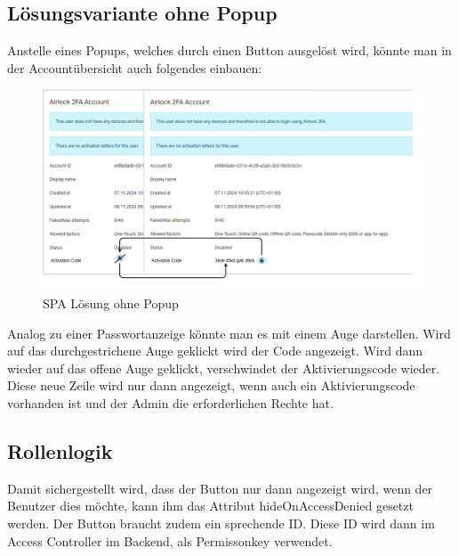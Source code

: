 \subsection{Lösungsvariante ohne Popup}
Anstelle eines Popups, welches durch einen Button ausgelöst wird, könnte man in der Accountübersicht auch folgendes einbauen:
\begin{figure}[H]
	\begin{center}
		\includegraphics[width=1.0\textwidth]{ressourcen/variant_2_spa}
		\caption[Variante ohne Popup]{SPA Lösung ohne Popup}\label{fig:withoutpopup}
	\end{center}
\end{figure}
\noindent Analog zu einer Passwortanzeige könnte man es mit einem Auge darstellen. Wird auf das durchgestrichene Auge geklickt wird der Code angezeigt. Wird dann wieder auf das offene Auge geklickt, verschwindet der Aktivierungscode wieder.\newline
Diese neue Zeile wird nur dann angezeigt, wenn auch ein Aktivierungscode vorhanden ist und der Admin die erforderlichen Rechte hat.

\subsection{Rollenlogik}
Damit sichergestellt wird, dass der Button nur dann angezeigt wird, wenn der Benutzer dies möchte, kann ihm das Attribut \flqq hideOnAccessDenied\frqq{} gesetzt werden. Der Button braucht zudem ein sprechende ID. Diese ID wird dann im Access Controller im Backend, als Permissonkey verwendet.


